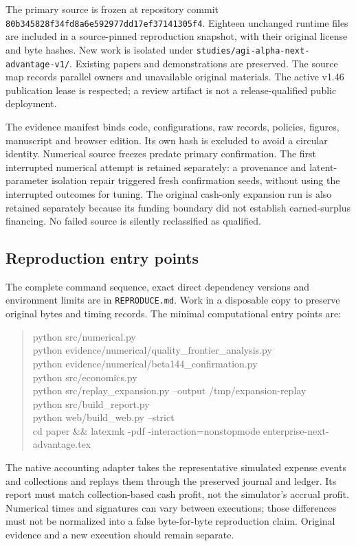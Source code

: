 \documentclass[11pt,letterpaper]{article}
\begin{document}
The primary source is frozen at repository commit \texttt{80b345828f34fd8a6e592977dd17ef37141305f4}. Eighteen unchanged runtime files are included in a source-pinned reproduction snapshot, with their original license and byte hashes. New work is isolated under \texttt{studies/agi-alpha-next-advantage-v1/}. Existing papers and demonstrations are preserved. The source map records parallel owners and unavailable original materials. The active v1.46 publication lease is respected; a review artifact is not a release-qualified public deployment.

The evidence manifest binds code, configurations, raw records, policies, figures, manuscript and browser edition. Its own hash is excluded to avoid a circular identity. Numerical source freezes predate primary confirmation. The first interrupted numerical attempt is retained separately: a provenance and latent-parameter isolation repair triggered fresh confirmation seeds, without using the interrupted outcomes for tuning. The original cash-only expansion run is also retained separately because its funding boundary did not establish earned-surplus financing. No failed source is silently reclassified as qualified.

\subsection{Reproduction entry points}

The complete command sequence, exact direct dependency versions and environment limits are in \texttt{REPRODUCE.md}. Work in a disposable copy to preserve original bytes and timing records. The minimal computational entry points are:
\begin{quote}\small\ttfamily
python src/numerical.py\\
python evidence/numerical/quality\_frontier\_analysis.py\\
python evidence/numerical/beta144\_confirmation.py\\
python src/economics.py\\
python src/replay\_expansion.py --output /tmp/expansion-replay\\
python src/build\_report.py\\
python web/build\_web.py --strict\\
cd paper \&\& latexmk -pdf -interaction=nonstopmode enterprise-next-advantage.tex
\end{quote}
The native accounting adapter takes the representative simulated expense events and collections and replays them through the preserved journal and ledger. Its report must match collection-based cash profit, not the simulator's accrual profit. Numerical times and signatures can vary between executions; those differences must not be normalized into a false byte-for-byte reproduction claim. Original evidence and a new execution should remain separate.
\end{document}
